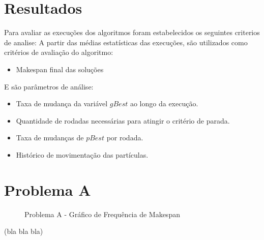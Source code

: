 \section{Resultados}
Para avaliar as execuções dos algoritmos foram estabelecidos os seguintes criterios de analise:
A partir das médias estatísticas das execuções, são utilizados como critérios de avaliação do algoritmo:
\begin{itemize}
\item Makespan final das soluções
\end{itemize}

\noindent E são parâmetros de análise:
\begin{itemize}
\item Taxa de mudança da variável $gBest$ ao longo da execução.
\item Quantidade de rodadas necessárias para atingir o critério de parada.
\item Taxa de mudanças de $pBest$ por rodada.
\item Histórico de movimentação das partículas.
\end{itemize}
%
\section{Problema A}
\begin{figure}
    \caption{Problema A - Gráfico de Frequência de Makespan}
    \label{fig:plobA-freq-mk}
    \begin{minipage}{.5\linewidth}
        \centering
        \subfloat[]{
            \label{plobA-freq-mk:a}
            \resizebox{\linewidth}{!}{}
        }
    \end{minipage}%
    \begin{minipage}{.5\linewidth}
        \centering
        \subfloat[]{
            \label{plobA-freq-mk:b}
            \resizebox{\linewidth}{!}{}
        }
    \end{minipage}\par\medskip
      \centering
      \subfloat[]{
        \label{plobA-freq-mk:c}
        \resizebox{.5\linewidth}{!}{}
      }
\end{figure}

(bla bla bla)
